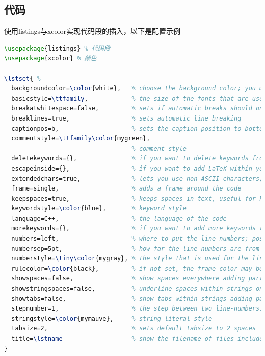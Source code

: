 \subsection{代码}
使用listings与xcolor实现代码段的插入，以下是配置示例
\begin{lstlisting}[language={TeX}]
\usepackage{listings} % 代码段
\usepackage{xcolor} % 颜色

\lstset{ %
  backgroundcolor=\color{white},   % choose the background color; you must add \usepackage{color} or \usepackage{xcolor}
  basicstyle=\ttfamily,            % the size of the fonts that are used for the code
  breakatwhitespace=false,         % sets if automatic breaks should only happen at whitespace
  breaklines=true,                 % sets automatic line breaking
  captionpos=b,                    % sets the caption-position to bottom
  commentstyle=\ttfamily\color{mygreen},    
                                   % comment style
  deletekeywords={},               % if you want to delete keywords from the given language
  escapeinside={},                 % if you want to add LaTeX within your code
  extendedchars=true,              % lets you use non-ASCII characters; for 8-bits encodings only, does not work with UTF-8
  frame=single,                    % adds a frame around the code
  keepspaces=true,                 % keeps spaces in text, useful for keeping indentation of code (possibly needs columns=flexible)
  keywordstyle=\color{blue},       % keyword style
  language=C++,                    % the language of the code
  morekeywords={},                 % if you want to add more keywords to the set
  numbers=left,                    % where to put the line-numbers; possible values are (none, left, right)
  numbersep=5pt,                   % how far the line-numbers are from the code
  numberstyle=\tiny\color{mygray}, % the style that is used for the line-numbers
  rulecolor=\color{black},         % if not set, the frame-color may be changed on line-breaks within not-black text (e.g. comments (green here))
  showspaces=false,                % show spaces everywhere adding particular underscores; it overrides 'showstringspaces'
  showstringspaces=false,          % underline spaces within strings only
  showtabs=false,                  % show tabs within strings adding particular underscores
  stepnumber=1,                    % the step between two line-numbers. If it's 1, each line will be numbered
  stringstyle=\color{mymauve},     % string literal style
  tabsize=2,                       % sets default tabsize to 2 spaces
  title=\lstname                   % show the filename of files included with ; also try caption instead of title
}
\end{lstlisting}

